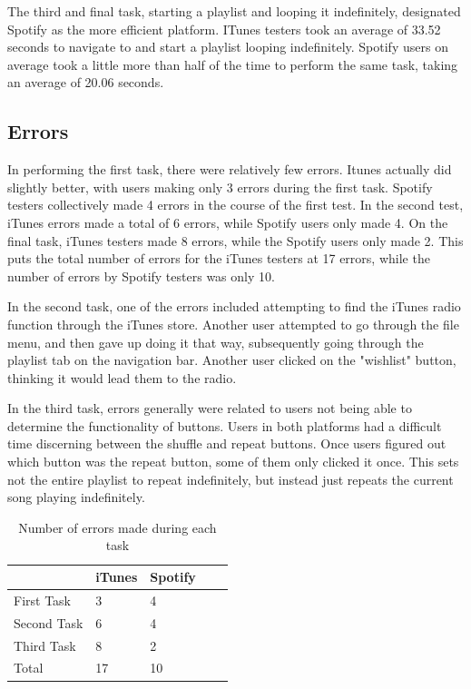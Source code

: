 \documentclass[12pt]{article}
\begin{document}
The third and final task, starting a playlist and looping it 
indefinitely, designated Spotify as the more efficient platform. 
ITunes testers took an average of 33.52 seconds to navigate to and 
start a playlist looping indefinitely. Spotify users on average 
took a little more than half of the time to perform the same task, 
taking an average of 20.06 seconds.

\subsection{Errors}

In performing the first task, there were relatively few errors. 
Itunes actually did slightly better, with users making only 3 
errors during the first task. Spotify testers collectively made 4 
errors in the course of the first test. In the second test, iTunes 
errors made a total of 6 errors, while Spotify users only made 4. 
On the final task, iTunes testers made 8 errors, while the Spotify 
users only made 2. This puts the total number of errors for the 
iTunes testers at 17 errors, while the number of errors by Spotify 
testers was only 10.

In the second task, one of the errors included attempting to find 
the iTunes radio function through the iTunes store. Another user 
attempted to go through the file menu, and then gave up doing it 
that way, subsequently going through the playlist tab on the 
navigation bar. Another user clicked on the "wishlist" button, 
thinking it would lead them to the radio.

In the third task,  errors generally were related to users not 
being able to determine the functionality of buttons. Users in 
both platforms had a difficult time discerning between the shuffle 
and repeat buttons. Once users figured out which button was the 
repeat button, some of them only clicked it once. This sets not 
the entire playlist to repeat indefinitely, but instead just 
repeats the current song playing indefinitely.

\begin{table}[h]
\centering
\begin{tabular}{lllll}
\hline
            & iTunes & Spotify &  &  \\ \hline
First Task  & 3      & 4       &  &  \\
Second Task & 6      & 4       &  &  \\
Third Task  & 8      & 2       &  &  \\ \hline
Total       & 17     & 10      &  & 
\end{tabular}
\caption{Number of errors made during each task}
\end{table}
\end{document}
